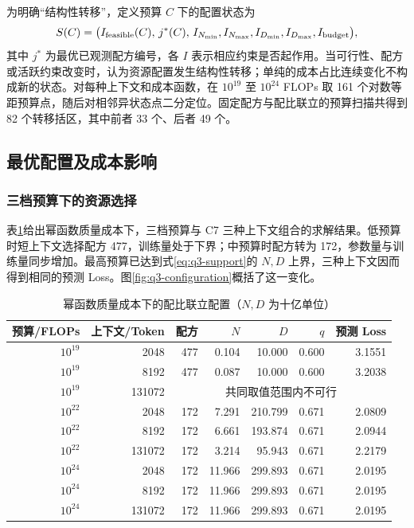 为明确“结构性转移”，定义预算 $C$ 下的配置状态为
\begin{equation}
 S(C)=\bigl(I_{\rm feasible}(C),\,j^*(C),\,
 I_{N_{\min}},I_{N_{\max}},I_{D_{\min}},I_{D_{\max}},I_{\rm budget}\bigr),
 \label{eq:q3-state}
\end{equation}
其中 $j^*$ 为最优已观测配方编号，各 $I$ 表示相应约束是否起作用。当可行性、配方或活跃约束改变时，认为资源配置发生结构性转移；单纯的成本占比连续变化不构成新的状态。对每种上下文和成本函数，在 $10^{19}$ 至 $10^{24}$ FLOPs 取 161 个对数等距预算点，随后对相邻异状态点二分定位。固定配方与配比联立的预算扫描共得到 82 个转移括区，其中前者 33 个、后者 49 个。

\subsection{最优配置及成本影响}

\subsubsection{三档预算下的资源选择}

表\ref{tab:q3-config}给出幂函数质量成本下，三档预算与 C7 三种上下文组合的求解结果。低预算时短上下文选择配方 477，训练量处于下界；中预算时配方转为 172，参数量与训练量同步增加。最高预算已达到式\eqref{eq:q3-support}的 $N,D$ 上界，三种上下文因而得到相同的预测 Loss。图\ref{fig:q3-configuration}概括了这一变化。

\begin{table}[htbp]
 \centering\small
 \caption{幂函数质量成本下的配比联立配置（$N,D$ 为十亿单位）}
 \label{tab:q3-config}
 \begin{tabular}{rrrrrrr}
 \toprule
 预算/FLOPs & 上下文/Token & 配方 & $N$ & $D$ & $q$ & 预测 Loss\\
 \midrule
 $10^{19}$ & 2048 & 477 & 0.104 & 10.000 & 0.600 & 3.1551\\
 $10^{19}$ & 8192 & 477 & 0.087 & 10.000 & 0.600 & 3.2038\\
 $10^{19}$ & 131072 & \multicolumn{5}{c}{共同取值范围内不可行}\\
 $10^{22}$ & 2048 & 172 & 7.291 & 210.799 & 0.671 & 2.0809\\
 $10^{22}$ & 8192 & 172 & 6.661 & 193.874 & 0.671 & 2.0944\\
 $10^{22}$ & 131072 & 172 & 3.214 & 95.943 & 0.671 & 2.2179\\
 $10^{24}$ & 2048 & 172 & 11.966 & 299.893 & 0.671 & 2.0195\\
 $10^{24}$ & 8192 & 172 & 11.966 & 299.893 & 0.671 & 2.0195\\
 $10^{24}$ & 131072 & 172 & 11.966 & 299.893 & 0.671 & 2.0195\\
 \bottomrule
 \end{tabular}
\end{table}

